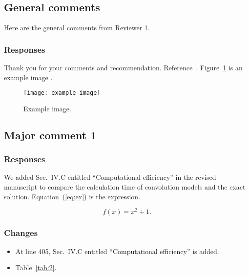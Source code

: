 \documentclass[12pt]{article}
\begin{document}
\subsection{General comments}
\begin{commentbox}
Here are the general comments from Reviewer 1.
\end{commentbox}



\subsubsection*{Responses}
Thank you for your comments and recommendation.
Reference~\cite{Zhong2022QuietZoneGeneration, Zhong2020InsertionLossThin}.
Figure~\ref{fig:ex} is an example image \cite{Zhong2020SphericalExpansionAudio}.

\begin{figure}[!htb]
    \centering
    \texttt{[image: example-image]}
    \caption{Example image.}
    \label{fig:ex}
\end{figure}

\subsection{Major comment 1}
\begin{commentbox}
\lipsum[3]
\end{commentbox}

\subsubsection*{Responses}
We added Sec.~IV.C entitled ``Computational efficiency'' in the revised manuscript to compare the calculation time of convolution models and the exact solution.
Equation~(\ref{eq:ex}) is the expression.

\begin{equation}
    f(x) = x^2 + 1.
    \label{eq:ex}
\end{equation}

\subsubsection*{Changes}
\begin{itemize}
    \item At line 405,
          Sec.~IV.C entitled ``Computational efficiency'' is added.
    \item Table~\ref{tab:2}.
\end{itemize}
\end{document}
